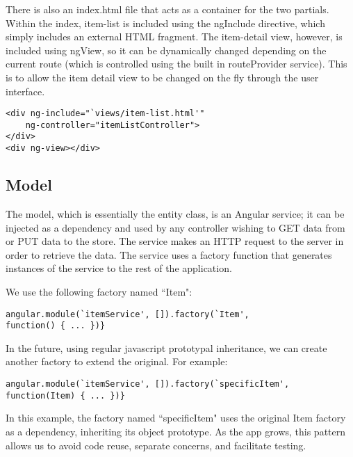 \documentclass[letterpaper, 12pt]{article}
\begin{document}
\noindent There is also an index.html file that acts as a container for the two partials. Within the index, item-list is included using the ngInclude directive, which simply includes an external HTML fragment. The item-detail view, however, is included using ngView, so it can be dynamically changed depending on the current route (which is controlled using the built in routeProvider service). This is to allow the item detail view to be changed on the fly through the user interface.

\vspace{2mm}
\vspace{-3mm}\begin{verbatim}
<div ng-include="`views/item-list.html'"
    ng-controller="itemListController">
</div>
<div ng-view></div>
\end{verbatim}

\subsection{Model}
\noindent The model, which is essentially the entity class, is an Angular service; it can be injected as a dependency and used by any controller wishing to GET data from or PUT data to the store. The service makes an HTTP request to the server in order to retrieve the data. The service uses a factory function that generates instances of the service to the rest of the application.

\noindent We use the following factory named ``Item":

\vspace{2mm}
\vspace{-3mm}\begin{verbatim}
angular.module(`itemService', []).factory(`Item',
function() { ... })}
\end{verbatim}

\noindent In the future, using regular javascript prototypal inheritance, we can create another factory to extend the original. For example:

\vspace{-3mm}\begin{verbatim}
angular.module(`itemService', []).factory(`specificItem',
function(Item) { ... })}
\end{verbatim}


\noindent In this example, the factory named ``specificItem" uses the original Item factory as a dependency, inheriting its object prototype. As the app grows, this pattern allows us to avoid code reuse, separate concerns, and facilitate testing.
\end{document}
